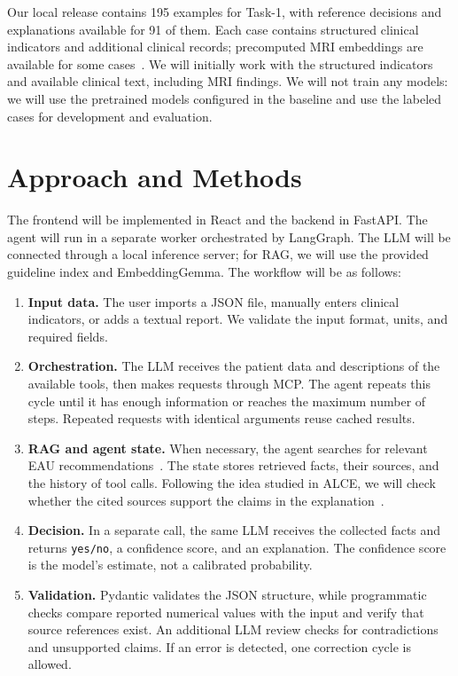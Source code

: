 \documentclass[english]{ucuproposal}
\begin{document}
Our local release contains 195 examples for Task-1, with reference decisions and explanations available for 91 of them. Each case contains structured clinical indicators and additional clinical records; precomputed MRI embeddings are available for some cases~\cite{chimeraData}. We will initially work with the structured indicators and available clinical text, including MRI findings. We will not train any models: we will use the pretrained models configured in the baseline and use the labeled cases for development and evaluation.

\section{Approach and Methods}

The frontend will be implemented in React and the backend in FastAPI. The agent will run in a separate worker orchestrated by LangGraph. The LLM will be connected through a local inference server; for RAG, we will use the provided guideline index and EmbeddingGemma. The workflow will be as follows:

\begin{enumerate}
\item \textbf{Input data.} The user imports a JSON file, manually enters clinical indicators, or adds a textual report. We validate the input format, units, and required fields.

\item \textbf{Orchestration.} The LLM receives the patient data and descriptions of the available tools, then makes requests through MCP. The agent repeats this cycle until it has enough information or reaches the maximum number of steps. Repeated requests with identical arguments reuse cached results.

\item \textbf{RAG and agent state.} When necessary, the agent searches for relevant EAU recommendations~\cite{eauDiagnosis2026}. The state stores retrieved facts, their sources, and the history of tool calls. Following the idea studied in ALCE, we will check whether the cited sources support the claims in the explanation~\cite{gao2023alce}.

\item \textbf{Decision.} In a separate call, the same LLM receives the collected facts and returns \texttt{yes/no}, a confidence score, and an explanation. The confidence score is the model's estimate, not a calibrated probability.

\item \textbf{Validation.} Pydantic validates the JSON structure, while programmatic checks compare reported numerical values with the input and verify that source references exist. An additional LLM review checks for contradictions and unsupported claims. If an error is detected, one correction cycle is allowed.
\end{enumerate}
\end{document}
